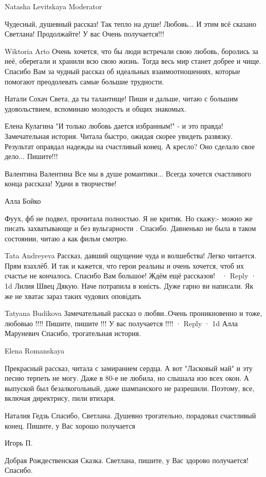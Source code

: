 Natasha Levitskaya
Moderator

Чудесный, душевный рассказ! Так тепло на душе! Любовь... И этим всё сказано Светлана! Продолжайте! У вас Очень получается!!!

Wiktoria Arto
Очень хочется, что бы люди встречали свою любовь, боролись за неё, оберегали и хранили всю свою жизнь. Тогда весь мир станет добрее и чище. Спасибо Вам за чудный рассказ об идеальных взаимоотношениях, которые помогают преодолевать самые большие трудности.

Натали Сохач
Света, да ты талантище! Пиши и дальше, читаю с большим удовольствием, вспоминаю молодость и общих знакомых.

Елена Кулагина
"И только любовь дается избранным!" - и это правда! Замечательная история. Читала быстро, ожидая скорее увидеть развязку. Результат оправдал надежды на счастливый конец. А кресло? Оно сделало свое дело... Пишите!!!

Валентина Валентина
Все мы в душе романтики... Всегда хочется счастливого конца рассказа! Удачи в творчестве!


Алла Бойко

Фуух, фб не подвел, прочитала полностью.
Я не критик. Но скажу:- можно же писать захватывающе и без вульгарности .
Спасибо.
Давненько не была в таком состоянии, читаю а как фильм смотрю.

Tata Andreyeva
Рассказ, давший ощущение чуда и волшебства! Легко читается. Прям взахлёб. И так и кажется, что герои реальны и очень хочется, чтоб их счастье не кончалось. Спасибо Вам большое! Ждём ещё рассказов! 👏
 · Reply · 1d
Лилия Швец
Дякую. Наче потрапила в юність. Дуже гарно ви написали. Як же не хватає зараз таких чудових оповідать

Tatyana Budikova
Замечательный рассказ о любви..Очень проникновенно и тоже, любовью !!!! Пишите, пишите !!! У вас получается !!!!
 · Reply · 1d
Алла Маруневич
Спасибо, трогательная история.

Elena Romanskaya

Прекрасный рассказ, читала с замиранием сердца. А вот "Ласковый май" и эту
песню терпеть не могу. Даже в 80-е не любила, но слышала изо всех окон. А
выпуской был безалкогольный, даже шампанского не разрешили. Поэтому, все,
включая директрису, пили втихаря.

Наталия Гедзь
Спасибо, Светлана. Душевно трогательно, порадовал счастливый конец. Пишите, у Вас хорошо получается

Игорь П.

Добрая Рождественская Сказка. Светлана, пишите, у Вас здорово получается! Спасибо.

